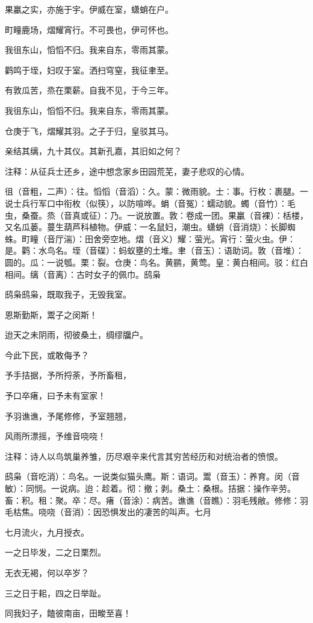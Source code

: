 \documentclass[12pt,UTF8]{ctexbook}
\begin{document}
果臝之实，亦施于宇。伊威在室，蟏蛸在户。

町疃鹿场，熠耀宵行。不可畏也，伊可怀也。

我徂东山，慆慆不归。我来自东，零雨其蒙。

鹳鸣于垤，妇叹于室。洒扫穹窒，我征聿至。

有敦瓜苦，烝在栗薪。自我不见，于今三年。

我徂东山，慆慆不归。我来自东，零雨其蒙。

仓庚于飞，熠耀其羽。之子于归，皇驳其马。

亲结其缡，九十其仪。其新孔嘉，其旧如之何？

注释：从征兵士还乡，途中想念家乡田园荒芜，妻子悲叹的心情。

徂（音粗，二声）：往。慆慆（音滔）：久。蒙：微雨貌。士：事。行枚：裹腿。一说士兵行军口中衔枚（似筷），以防喧哗。蜎（音冤）：蠕动貌。蠋（音竹）：毛虫，桑蚕。烝（音真或征）：乃。一说放置。敦：卷成一团。果臝（音裸）：栝楼，又名瓜蒌。蔓生葫芦科植物。伊威：一名鼠妇，潮虫。蟏蛸（音消烧）：长脚蜘蛛。町疃（音厅湍）：田舍旁空地。熠（音义）耀：萤光。宵行：萤火虫。伊：是。鹳：水鸟名。垤（音碟）：蚂蚁壅的土堆。聿（音玉）：语助词。敦（音堆）：圆的。瓜：一说瓠。栗：裂。仓庚：鸟名。黄鹂，黄莺。皇：黄白相间。驳：红白相间。缡（音离）：古时女子的佩巾。鸱枭

鸱枭鸱枭，既取我子，无毁我室。

恩斯勤斯，鬻子之闵斯！

迨天之未阴雨，彻彼桑土，绸缪牖户。

今此下民，或敢侮予？

予手拮据，予所捋荼，予所畜租，

予口卒瘏，曰予未有室家！

予羽谯谯，予尾修修，予室翘翘，

风雨所漂摇，予维音哓哓！

注释：诗人以鸟筑巢养雏，历尽艰辛来代言其穷苦经历和对统治者的愤恨。

鸱枭（音吃消）：鸟名。一说类似猫头鹰。斯：语词。鬻（音玉）：养育。闵（音敏）：同悯。一说病。迨：趁着。彻：撤；剥。桑土：桑根。拮据：操作辛劳。畜：积。租：聚。卒：尽。瘏（音涂）：病苦。谯谯（音瞧）：羽毛残敝。修修：羽毛枯焦。哓哓（音消）：因恐惧发出的凄苦的叫声。七月

七月流火，九月授衣。

一之日毕发，二之日栗烈。

无衣无褐，何以卒岁？

三之日于耜，四之日举趾。

同我妇子，饁彼南亩，田畯至喜！
\end{document}
